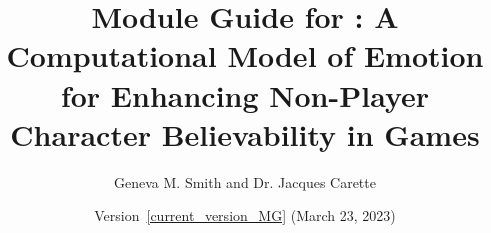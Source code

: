\documentclass[11pt, titlepage]{article}
\begin{document}
    \setcounter{pagesMG}{\totalpages}

    \begin{titlepage}
        \thispagestyle{empty}

        \title{Module Guide for \progname{}: A Computational Model of Emotion
        for
        Enhancing Non-Player Character Believability in Games}
        \author{Geneva M. Smith and Dr. Jacques Carette}
        \date{Version~\ref{current_version_MG} (March 23, 2023)}

        \maketitle
    \end{titlepage}

    \pagestyle{fancy}
\end{document}

